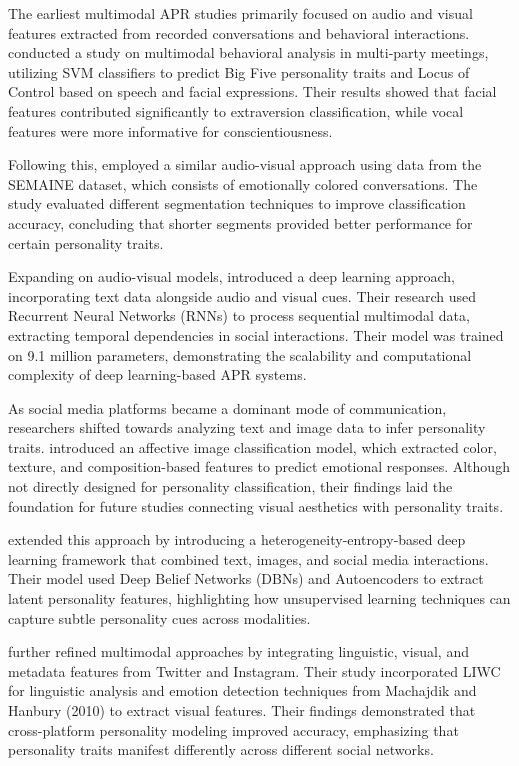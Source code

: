 The earliest multimodal APR studies primarily focused on audio and visual features extracted from recorded conversations and behavioral interactions. \citet{Pianesi2008} conducted a study on multimodal behavioral analysis in multi-party meetings, utilizing SVM classifiers to predict Big Five personality traits and Locus of Control based on speech and facial expressions. Their results showed that facial features contributed significantly to extraversion classification, while vocal features were more informative for conscientiousness.

Following this, \citet{Sidorov2014} employed a similar audio-visual approach using data from the SEMAINE dataset, which consists of emotionally colored conversations. The study evaluated different segmentation techniques to improve classification accuracy, concluding that shorter segments provided better performance for certain personality traits.

Expanding on audio-visual models, \citet{Lima2022} introduced a deep learning approach, incorporating text data alongside audio and visual cues. Their research used Recurrent Neural Networks (RNNs) to process sequential multimodal data, extracting temporal dependencies in social interactions. Their model was trained on 9.1 million parameters, demonstrating the scalability and computational complexity of deep learning-based APR systems.

As social media platforms became a dominant mode of communication, researchers shifted towards analyzing text and image data to infer personality traits. \citet{Machajdik2010} introduced an affective image classification model, which extracted color, texture, and composition-based features to predict emotional responses. Although not directly designed for personality classification, their findings laid the foundation for future studies connecting visual aesthetics with personality traits.

\citet{Xianyu2016} extended this approach by introducing a heterogeneity-entropy-based deep learning framework that combined text, images, and social media interactions. Their model used Deep Belief Networks (DBNs) and Autoencoders to extract latent personality features, highlighting how unsupervised learning techniques can capture subtle personality cues across modalities.

\citet{Skowron2016} further refined multimodal approaches by integrating linguistic, visual, and metadata features from Twitter and Instagram. Their study incorporated LIWC for linguistic analysis and emotion detection techniques from Machajdik and Hanbury (2010) to extract visual features. Their findings demonstrated that cross-platform personality modeling improved accuracy, emphasizing that personality traits manifest differently across different social networks.

